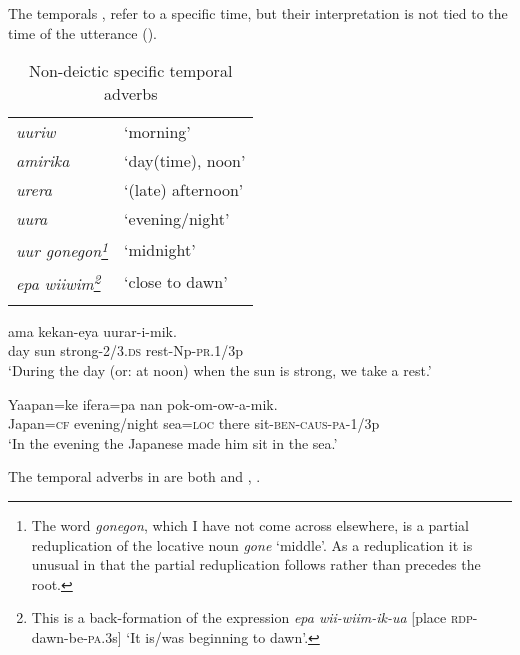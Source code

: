 The  temporals ,   refer to a specific time, but their interpretation is not tied to the time of the utterance  (). 

\begin{table}[b]
\caption{Non-deictic specific temporal adverbs}
\label{tab:3:nondeicticspecifictemporal}

\begin{tabular}{>{\itshape}ll}
\mytoprule
uuriw &`morning'\\
amirika &`day(time), noon'\\
urera &`(late) afternoon'\\
uura &`evening/night'\\
uur gonegon\footnote{The word \textit{gonegon}, which I have not come across elsewhere, is a partial reduplication of the locative noun \textit{gone} `middle'. As a reduplication it is unusual in that the partial reduplication follows rather than precedes the root.} &`midnight'\\
epa wiiwim\footnote{This is a back-formation of the expression \textit{epa wii-wiim-ik-ua} [place \textsc{rdp}-dawn-be-\textsc{pa}.3s] `It is/was beginning to dawn'.} &`close to dawn'\\
\mybottomrule 
\end{tabular}

\end{table}

\ea%
\label{ex:3:x698}
\gll {} ama kekan-eya uurar-i-mik. \\
day sun strong-2/3.\textsc{ds} rest-Np-\textsc{pr}.1/3p\\
\glt`During the day (or: at noon) when the sun is strong, we take a rest.'
\z

\ea%
\label{ex:3:x699}
\gll Yaapan=ke  ifera=pa nan pok-om-ow-a-mik. \\
Japan=\textsc{cf} evening/night sea=\textsc{loc} there sit-\textsc{ben}-\textsc{caus}-\textsc{pa}-1/3p\\
\glt`In the evening the Japanese made him sit in the sea.'
\z

The temporal adverbs in  are both  and  , .

